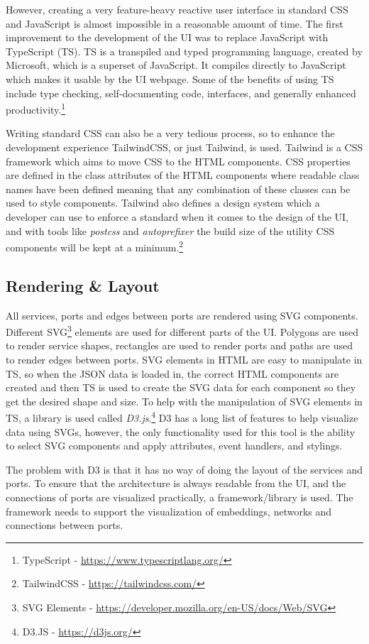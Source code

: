 However, creating a very feature-heavy reactive user interface in standard CSS and JavaScript is almost impossible in a reasonable amount of time.
The first improvement to the development of the UI was to replace JavaScript with TypeScript (TS).
TS is a transpiled and typed programming language, created by Microsoft, which is a superset of JavaScript. It compiles directly to JavaScript which makes it usable by the UI webpage.
Some of the benefits of using TS include type checking, self-documenting code, interfaces, and generally enhanced productivity.\footnote{TypeScript - \url{https://www.typescriptlang.org/}}

Writing standard CSS can also be a very tedious process, so to enhance the development experience TailwindCSS, or just Tailwind, is used.
Tailwind is a CSS framework which aims to move CSS to the HTML components. CSS properties are defined in the class attributes of the HTML components where readable class names have been defined meaning that any combination of these classes can be used to style components.
Tailwind also defines a design system which a developer can use to enforce a standard when it comes to the design of the UI, and with tools like \emph{postcss} and \emph{autoprefixer} the build size of the utility CSS components will be kept at a minimum.\footnote{TailwindCSS - \url{https://tailwindcss.com/}}

\subsection{Rendering \& Layout}
All services, ports and edges between ports are rendered using SVG components.
Different SVG\footnote{SVG Elements - \url{https://developer.mozilla.org/en-US/docs/Web/SVG}} elements are used for different parts of the UI. Polygons are used to render service shapes, rectangles are used to render ports and paths are used to render edges between ports.
SVG elements in HTML are easy to manipulate in TS, so when the JSON data is loaded in, the correct HTML components are created and then TS is used to create the SVG data for each component so they get the desired shape and size.
To help with the manipulation of SVG elements in TS, a library is used called \emph{D3.js}.\footnote{D3.JS - \url{https://d3js.org/}} D3 has a long list of features to help visualize data using SVGs, however, the only functionality used for this tool is
the ability to select SVG components and apply attributes, event handlers, and stylings.

The problem with D3 is that it has no way of doing the layout of the services and ports.
To ensure that the architecture is always readable from the UI, and the connections of ports are visualized practically, a framework/library is used.
The framework needs to support the visualization of embeddings, networks and connections between ports.

